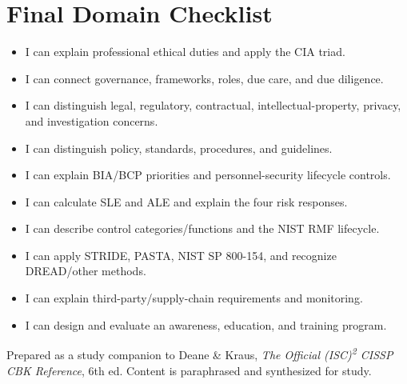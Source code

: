 \documentclass[10pt,letterpaper]{article}
\begin{document}
\section{Final Domain Checklist}
\begin{itemize}[label=\(\square\)]
\item I can explain professional ethical duties and apply the CIA triad.
\item I can connect governance, frameworks, roles, due care, and due diligence.
\item I can distinguish legal, regulatory, contractual, intellectual-property, privacy, and investigation concerns.
\item I can distinguish policy, standards, procedures, and guidelines.
\item I can explain BIA/BCP priorities and personnel-security lifecycle controls.
\item I can calculate SLE and ALE and explain the four risk responses.
\item I can describe control categories/functions and the NIST RMF lifecycle.
\item I can apply STRIDE, PASTA, NIST SP 800-154, and recognize DREAD/other methods.
\item I can explain third-party/supply-chain requirements and monitoring.
\item I can design and evaluate an awareness, education, and training program.
\end{itemize}

\vfill
{\footnotesize\color{Teal}Prepared as a study companion to Deane \& Kraus, \textit{The Official (ISC)\textsuperscript{2} CISSP CBK Reference}, 6th ed. Content is paraphrased and synthesized for study.}
\end{document}
